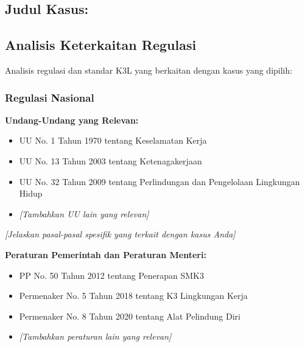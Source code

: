 
\subsection*{Judul Kasus: \underline{\hspace{10cm}}}

\vspace{0.5cm}

\subsection{Analisis Keterkaitan Regulasi}
\label{subsec:analisis-regulasi}


Analisis regulasi dan standar K3L yang berkaitan dengan kasus yang dipilih:

\subsubsection{Regulasi Nasional}

\textbf{Undang-Undang yang Relevan:}
\begin{itemize}
    \item UU No. 1 Tahun 1970 tentang Keselamatan Kerja
    \item UU No. 13 Tahun 2003 tentang Ketenagakerjaan
    \item UU No. 32 Tahun 2009 tentang Perlindungan dan Pengelolaan Lingkungan Hidup
    \item \textit{[Tambahkan UU lain yang relevan]}
\end{itemize}

\textit{[Jelaskan pasal-pasal spesifik yang terkait dengan kasus Anda]}

\vspace{0.5cm}

\textbf{Peraturan Pemerintah dan Peraturan Menteri:}
\begin{itemize}
    \item PP No. 50 Tahun 2012 tentang Penerapan SMK3
    \item Permenaker No. 5 Tahun 2018 tentang K3 Lingkungan Kerja
    \item Permenaker No. 8 Tahun 2020 tentang Alat Pelindung Diri
    \item \textit{[Tambahkan peraturan lain yang relevan]}
\end{itemize}

